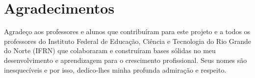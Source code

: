 
\chapter*{Agradecimentos}

Agradeço aos professores e alunos que contribuíram para este projeto e a todos os professores do Instituto Federal de Educação, Ciência e Tecnologia do Rio Grande do Norte (IFRN) que colaboraram e construíram bases sólidas no meu desenvolvimento e aprendizagem para o crescimento profissional. Seus nomes são inesquecíveis e por isso, dedico-lhes minha profunda admiração e respeito. 
